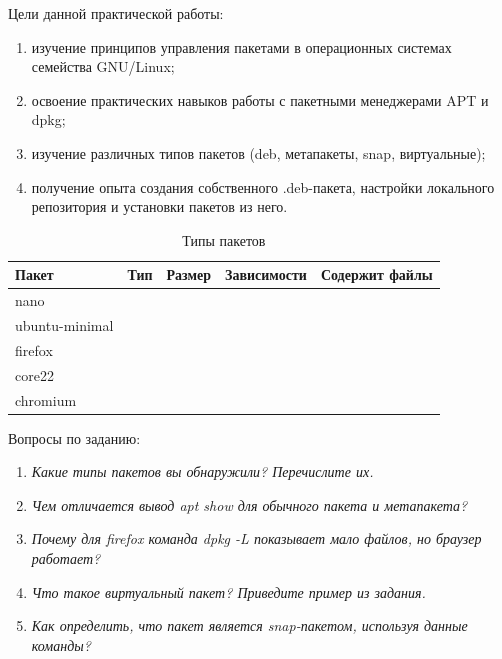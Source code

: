 
Цели данной практической работы:
\begin{enumerate}
	\item изучение принципов управления пакетами в операционных системах семейства GNU/Linux;
	\item освоение практических навыков работы с пакетными менеджерами APT и dpkg;
	\item изучение различных типов пакетов (deb, метапакеты, snap, виртуальные);
	\item получение опыта создания собственного .deb-пакета, настройки локального репозитория и установки пакетов из него.
\end{enumerate}



\begin{table}[!htbp]
	\caption{Типы пакетов}
	\begin{tabularx}{\linewidth}{|X|X|X|X|X|}
		\hline
		\textbf{Пакет} & \textbf{Тип} & \textbf{Размер} & \textbf{Зависимости} & С\textbf{одержит файлы} \\\hline
		nano &&&& \\\hline
		ubuntu-minimal &&&& \\\hline
		firefox &&&& \\\hline
		core22 &&&& \\\hline
		chromium &&&& \\\hline
	\end{tabularx}
\end{table}

Вопросы по заданию:
\begin{enumerate}
	\item \textit{Какие типы пакетов вы обнаружили? Перечислите их.}
	\item \textit{Чем отличается вывод apt show для обычного пакета и метапакета?}
	\item \textit{Почему для firefox команда dpkg -L показывает мало файлов, но браузер работает?}
	\item \textit{Что такое виртуальный пакет? Приведите пример из задания.}
	\item \textit{Как определить, что пакет является snap-пакетом, используя данные команды?}
\end{enumerate}


